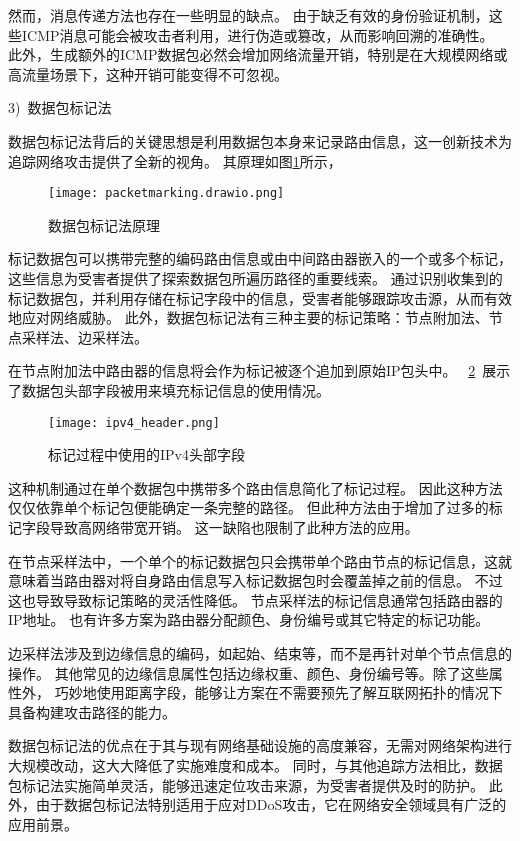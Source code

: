 然而，消息传递方法也存在一些明显的缺点。
由于缺乏有效的身份验证机制，这些ICMP消息可能会被攻击者利用，进行伪造或篡改，从而影响回溯的准确性。
此外，生成额外的ICMP数据包必然会增加网络流量开销，特别是在大规模网络或高流量场景下，这种开销可能变得不可忽视。


3)~数据包标记法\par
数据包标记法背后的关键思想是利用数据包本身来记录路由信息，这一创新技术为追踪网络攻击提供了全新的视角。
其原理如图\ref{fig:packet_marking}所示，
\begin{figure}[h]
  \centering
  \texttt{[image: packetmarking.drawio.png]}
  \caption{数据包标记法原理}
  \label{fig:packet_marking}
\end{figure}
标记数据包可以携带完整的编码路由信息或由中间路由器嵌入的一个或多个标记，这些信息为受害者提供了探索数据包所遍历路径的重要线索。
通过识别收集到的标记数据包，并利用存储在标记字段中的信息，受害者能够跟踪攻击源，从而有效地应对网络威胁。
此外，数据包标记法有三种主要的标记策略：节点附加法、节点采样法、边采样法\cite{fazio2020packet}。

在节点附加法中路由器的信息将会作为标记被逐个追加到原始IP包头中\cite{suresh2021sanguine,Nur2021Abdullah}。
~\ref{fig:ipv4_header}~展示了数据包头部字段被用来填充标记信息的使用情况。
\begin{figure}[h]
  \centering
  \texttt{[image: ipv4\_header.png]}
  \caption{标记过程中使用的IPv4头部字段}
  \label{fig:ipv4_header}
\end{figure}
这种机制通过在单个数据包中携带多个路由信息简化了标记过程。
因此这种方法仅仅依靠单个标记包便能确定一条完整的路径。
但此种方法由于增加了过多的标记字段导致高网络带宽开销。
这一缺陷也限制了此种方法的应用。\par

在节点采样法中，一个单个的标记数据包只会携带单个路由节点的标记信息，这就意味着当路由器对将自身路由信息写入标记数据包时会覆盖掉之前的信息。
不过这也导致导致标记策略的灵活性降低。
节点采样法的标记信息通常包括路由器的IP地址。
也有许多方案为路由器分配颜色、身份编号或其它特定的标记功能\cite{Zhou2019Linna,Wu2018Bo}。\par

边采样法涉及到边缘信息的编码，如起始、结束等，而不是再针对单个节点信息的操作。
其他常见的边缘信息属性包括边缘权重、颜色、身份编号等。除了这些属性外，
巧妙地使用距离字段，能够让方案在不需要预先了解互联网拓扑的情况下具备构建攻击路径的能力。\par

数据包标记法的优点在于其与现有网络基础设施的高度兼容，无需对网络架构进行大规模改动，这大大降低了实施难度和成本。
同时，与其他追踪方法相比，数据包标记法实施简单灵活，能够迅速定位攻击来源，为受害者提供及时的防护。
此外，由于数据包标记法特别适用于应对DDoS攻击，它在网络安全领域具有广泛的应用前景。\par

